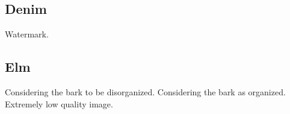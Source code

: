 \documentclass[12pt,a4paper]{article}
\begin{document}
\begin{singlespace}
\clearpage
\renewcommand{\mat}{Denim}
\subsection{\mat}

\renewcommand{\Number}{01}\InputImage{\sexor}{\tsm}{\sexor}{\tsm}{\sexor}{\tsm}
{}{}
\renewcommand{\Number}{02}\InputImage{\sexor}{\tsm}{\sexor}{\tsm}{\sexor}{\tsm}
{}{}
\renewcommand{\Number}{03}\InputImage{\sexor}{\tsm}{\sexor}{\tsm}{\sexdi}{\tbu}
{}{}
\renewcommand{\Number}{04}\InputImage{\sexor}{\tsm}{\sexor}{\tsm}{\sexdi}{\tbu}
{}{}
\renewcommand{\Number}{05}\InputImage{\sexor}{\tsm}{\sexor}{\tsm}{\sexor}{\tsm}
{}{}
\renewcommand{\Number}{06}\InputImage{\sro}{\tsm}{\sro}{\tsm}{\sro}{\tsm}
{}{}
\renewcommand{\Number}{07}\InputImage{\sexor}{\tsm}{\sexor}{\tsm}{\sexdi}{\tsm}
{}{}
\renewcommand{\Number}{08}\InputImage{\sexor}{\tsm}{\sexor}{\tsm}{\sexor}{\tsm}
{Watermark.}{}
\renewcommand{\Number}{09}\InputImage{\sro}{\tsm}{\sro}{\tsm}{\sro}{\tsm}
{}{}
\renewcommand{\Number}{10}\InputImage{\sexor}{\tsm}{\sexor}{\tsm}{\sexdi}{\tbu}
{}{}
\renewcommand{\Number}{11}\InputImage{\sro}{\tsm}{\sro}{\tsm}{\sro}{\tbu}
{}{}
\renewcommand{\Number}{12}\InputImage{\sro}{\tsm}{\sro}{\tsm}{\sro}{\tbu}
{}{}

\clearpage
\renewcommand{\mat}{Elm}
\subsection{\mat}

\renewcommand{\Number}{01}\InputImage{\sfl}{\tco}{\sexdi}{\tbu}{\sexdi}{\tbu}
{}{Considering the bark to be disorganized.}
\renewcommand{\Number}{02}\InputImage{\sfl}{\tco}{\sro}{\tbu}{\sro}{\tbu}
{}{}
\renewcommand{\Number}{03}\InputImage{\sfl}{\tco}{\sexdi}{\tbu}{\sexdi}{\tbu}
{}{}
\renewcommand{\Number}{04}\InputImage{\sfl}{\tco}{\sexdi}{\tbu}{\sexdi}{\tbu}
{}{}
\renewcommand{\Number}{05}\InputImage{\sfl}{\tco}{\sexdi}{\tbu}{\sexdi}{\tbu}
{}{}
\renewcommand{\Number}{06}\InputImage{\sfl}{\tco}{\sexor}{\tbu}{\sexor}{\tbu}
{}{Considering the bark as organized.}
\renewcommand{\Number}{07}\InputImage{\sfl}{\tco}{\sexdi}{\tbu}{\sexdi}{\tbu}
{}{}
\renewcommand{\Number}{08}\InputImage{\sfl}{\tco}{\sexdi}{\tbu}{\sexdi}{\tbu}
{}{}
\renewcommand{\Number}{09}\InputImage{\sfl}{\tco}{\sexdi}{\tbu}{\sexdi}{\tbu}
{}{}
\renewcommand{\Number}{10}\InputImage{\sfl}{\tco}{\sfl}{\tco}{\sexdi}{\tbu}
{}{}
\renewcommand{\Number}{11}\InputImage{\sfl}{\tco}{\sexdi}{\tbu}{\sexdi}{\tbu}
{Extremely low quality image.}{}
\renewcommand{\Number}{12}\InputImage{\sfl}{\tco}{\sro}{\tbu}{\sro}{\tbu}
{}{}


\end{singlespace}
\end{document}
